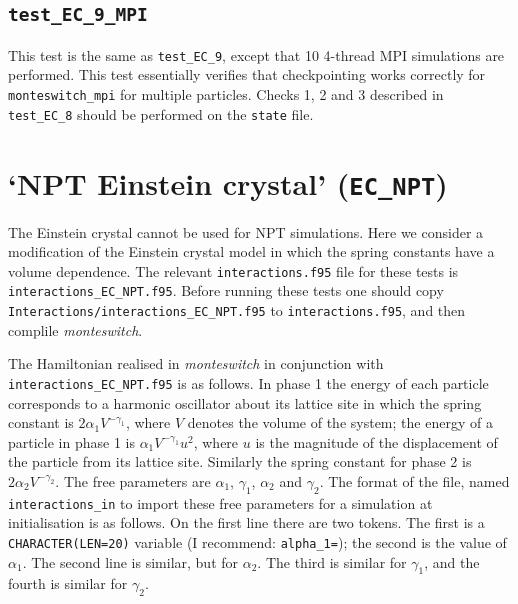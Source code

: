 \documentclass{report}
\begin{document}
\subsection{\texttt{test\_EC\_9\_MPI}}
This test is the same as \texttt{test\_EC\_9}, except that 10 4-thread MPI simulations are performed. This test essentially verifies 
that checkpointing works correctly for \texttt{monteswitch\_mpi} for multiple particles. Checks 1, 2 and 3 described in \texttt{test\_EC\_8} should be 
performed on the \texttt{state} file.




\section{`NPT Einstein crystal' (\texttt{EC\_NPT})}
The Einstein crystal cannot be used for NPT simulations. Here we consider a modification of the Einstein
crystal model in which the spring constants have a volume dependence. The relevant \texttt{interactions.f95} file for these tests is 
\texttt{interactions\_EC\_NPT.f95}. Before running these tests one should copy 
\texttt{Interactions/interactions\_EC\_NPT.f95} to \texttt{interactions.f95}, and then complile 
\emph{monteswitch}.

The Hamiltonian realised in \emph{monteswitch} in conjunction with \texttt{interactions\_EC\_NPT.f95} is 
as follows. In phase 1 the energy of each particle corresponds to a harmonic oscillator about its
lattice site in which the spring constant is $2\alpha_1V^{-\gamma_1}$, where $V$ denotes the volume of 
the system; the energy of a particle in phase 1 is $\alpha_1V^{-\gamma_1}u^2$, where $u$ is the magnitude of the displacement
of the particle from its lattice site. Similarly the spring constant for phase 2 is $2\alpha_2V^{-\gamma_2}$.
The free parameters are $\alpha_1$, $\gamma_1$, $\alpha_2$ and $\gamma_2$.
The format of the file, named \texttt{interactions\_in} to import these free parameters for a simulation at initialisation
is as follows. On the first line there are two tokens. The first is a \texttt{CHARACTER(LEN=20)} variable (I recommend: \texttt{alpha\_1=});
the second is the value of $\alpha_1$. The second line is similar, but for $\alpha_2$. The third is similar for $\gamma_1$, 
and the fourth is similar for $\gamma_2$.
\end{document}
